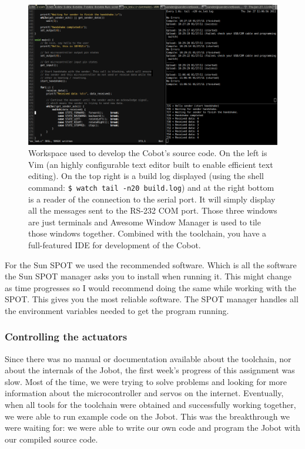 \documentclass[a4paper,10pt]{article} %
\begin{document}
\begin{figure}[H]
\hspace{-1.2in}
\includegraphics[scale=0.5]{img/workspace}
\caption{Workspace used to develop the Cobot's source code. On the left is Vim
(an highly configurable text editor built to enable efficient text editing). On
the top right is a build log displayed (using the shell command: \texttt{\$
watch tail -n20 build.log}) and at the right bottom is a reader of the
connection to the serial port. It will simply display all the messages sent to
the RS-232 COM port. Those three windows are just terminals and Awesome
Window Manager is used to tile those windows together. Combined with the
toolchain, you have a full-featured IDE for development of the Cobot.}
\end{figure}

For the Sun SPOT we used the recommended software. Which is all
the software the Sun SPOT manager asks you to install when running it. This
might change as time progresses so I would recommend doing the same while
working with the SPOT. This gives you the most reliable software. The
SPOT manager handles all the environment variables needed to get
the program running.


\subsubsection{Controlling the actuators} %
\label{sub:Cobot implementation}

Since there was no manual or documentation available about the toolchain, nor
about the internals of the Jobot, the first week's progress of this assignment
was slow. Most of the time, we were trying to solve problems and looking for
more information about the microcontroller and servos on the internet.
Eventually, when all tools for the toolchain were obtained and successfully
working together, we were able to run example code on the Jobot. This was the
breakthrough we were waiting for: we were able to write our own code and program
the Jobot with our compiled source code.
\end{document}

